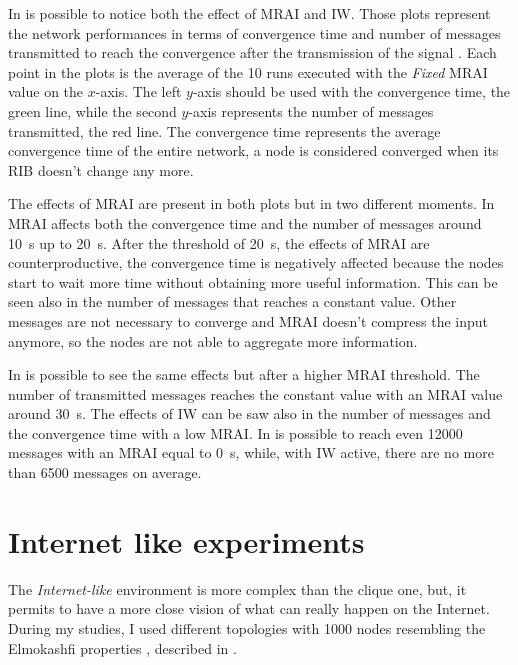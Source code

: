 In  is possible to notice both the effect of \ac{MRAI}
and \ac{IW}.
Those plots represent the network performances in terms of convergence time and
number of messages transmitted to reach the convergence after the transmission
of the signal .
Each point in the plots is the average of the \num{10} runs executed with the
\textit{Fixed} \ac{MRAI} value on the $x$-axis.
The left $y$-axis should be used with the convergence time, the green line, while
the second $y$-axis represents the number of messages transmitted, the red line.
The convergence time represents the average convergence time of the entire network,
a node is considered converged when its \ac{RIB} doesn't change any more.

The effects of \ac{MRAI} are present in both plots but in two different moments.
In  \ac{MRAI} affects both the convergence time and
the number of messages around \SI{10}{\second} up to \SI{20}{\second}.
After the threshold of \SI{20}{\second}, the effects of \ac{MRAI} are counterproductive,
the convergence time is negatively affected because the nodes start to wait more
time without obtaining more useful information.
This can be seen also in the number of messages that reaches a constant value.
Other messages are not necessary to converge and \ac{MRAI} doesn't compress
the input anymore, so the nodes are not able to aggregate more information.

In  is possible to see the same effects but after a higher
\ac{MRAI} threshold.
The number of transmitted messages reaches the constant value with an \ac{MRAI}
value around \SI{30}{\second}.
The effects of \ac{IW} can be saw also in the number of messages and the convergence
time with a low \ac{MRAI}.
In  is possible to reach even \num{12000} messages
with an \ac{MRAI} equal to \SI{0}{\second}, while, with \ac{IW} active, there are no
more than \num{6500} messages on average.

\section{Internet like experiments}
\label{sec:bgp_mrai_internet_like}

The \textit{Internet-like} environment is more complex than the clique one, but, it permits
to have a more close vision of what can really happen on the Internet.
During my studies, I used different topologies with \num{1000} nodes resembling
the Elmokashfi properties \cite{elmokashfi2010scalability},
described in .

